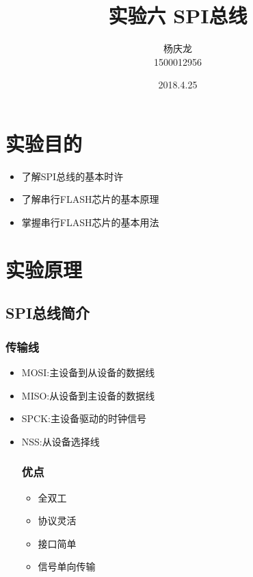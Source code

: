 \documentclass{article}
\begin{document}

\begin{CJK}{UTF8}{gkai}
\title{实验六 SPI总线}
\author{杨庆龙 \\1500012956}
\date{2018.4.25}
\maketitle
\section{实验目的}
\begin{itemize}
  \item 了解SPI总线的基本时许
  \item 了解串行FLASH芯片的基本原理
  \item 掌握串行FLASH芯片的基本用法
\end{itemize}
\section{实验原理}
\subsection{SPI总线简介}
\subsubsection{传输线}
\begin{itemize}
  \item MOSI:主设备到从设备的数据线
  \item MISO:从设备到主设备的数据线
  \item SPCK:主设备驱动的时钟信号
  \item NSS:从设备选择线
\subsubsection{优点}
\begin{itemize}
  \item 全双工
  \item 协议灵活
  \item 接口简单
  \item 信号单向传输
\end{itemize}

\end{itemize}
\end{CJK}
\end{document}
